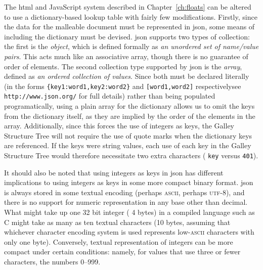 The \gls{html} and JavaScript system described in Chapter~\ref{ch:floats} can be altered to use a dictionary-based lookup table with fairly few modifications. Firstly, since the data for the malleable document must be represented in \gls{json}, some means of including the dictionary must be devised. \gls{json} supports two types of collection: the first is the \emph{object}, which is defined formally as \emph{an \mbox{unordered} set of name/value pairs}. This acts much like an associative array, though there is no guarantee of order of elements.  The second collection type supported by \gls{json} is the \emph{array}, defined as \emph{an ordered collection of values}. Since both must be declared literally (in the forms \texttt{\{\textquotedbl key1\textquotedbl:\textquotedbl word1\textquotedbl,\textquotedbl key2\textquotedbl:\textquotedbl word2\textquotedbl\}} and \texttt{[\textquotedbl word1\textquotedbl,\textquotedbl word2\textquotedbl]} respectively\ed see \texttt{http://www.json.org/} for full details) rather than being populated programatically, using a plain array for the dictionary allows us to omit the keys from the dictionary itself, as they are implied by the order of the elements in the array. Additionally, since this forces the use of integers as keys, the Galley Structure Tree will not require the use of quote marks when the dictionary keys are referenced. If the keys were string values, each use of each key in the Galley Structure Tree would therefore necessitate two extra characters (\eg{} \texttt{\textquotedbl key\textquotedbl} versus \texttt{401}).

It should also be noted that using integers as keys in \gls{json} has different implications to using integers as keys in some more compact binary format. \gls{json} is always stored in some textual encoding (perhaps \textsc{ascii}, perhaps \textsc{utf-8}), and there is no support for numeric representation in any base other than decimal. What might take up one 32 bit integer (\ie{} 4 bytes) in a compiled language such as C might take as many as ten textual characters (10 bytes, assuming that whichever character encoding system is used represents low-\textsc{ascii} characters with only one byte). Conversely, textual representation of integers can be more compact under certain conditions: namely, for values that use three or fewer characters, \ie{} the numbers 0--999.

